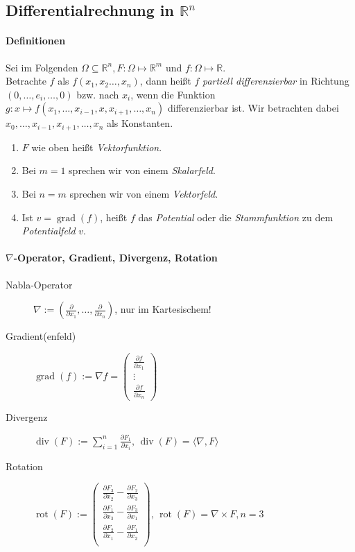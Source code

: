 \documentclass[a4paper, 9pt, DIV=24]{scrartcl}
\DeclareMathOperator{\grad}{grad}
\DeclareMathOperator{\rot}{rot}
\DeclareMathOperator{\Div}{div}
\newcommand{\R}{\mathbb{R}}
\begin{document}
\clearpage
\subsection{Differentialrechnung in $\mathbb{R}^n$}
\paragraph{Definitionen}
Sei im Folgenden $\Omega \subseteq \R^n, F: \Omega \mapsto \R^m$ und $f: \Omega \mapsto \R$. \\
Betrachte $f$ als $f(x_1,x_2\dots,x_n)$, dann heißt $f$ \emph{partiell differenzierbar} in Richtung $(0,\dots,e_i,\dots,0)$ bzw. nach $x_i$,
wenn die Funktion $g: x \mapsto f(x_1,\dots,x_{i-1},x,x_{i+1},\dots,x_n)$ differenzierbar ist. Wir betrachten dabei $x_0,\dots,x_{i-1},x_{i+1},\dots,x_n$ als Konstanten.

\begin{enumerate}[label={(}\arabic*{)}]
 \item $F$ wie oben heißt \emph{Vektorfunktion}.
 \item Bei $m = 1$ sprechen wir von einem \emph{Skalarfeld}.
 \item Bei $n = m$ sprechen wir von einem \emph{Vektorfeld}.
 \item Ist $v = \grad(f)$, heißt $f$ das \emph{Potential} oder die \emph{Stammfunktion} zu dem \emph{Potentialfeld} $v$.
\end{enumerate}

\paragraph{$\nabla$-Operator, Gradient, Divergenz, Rotation}
\begin{description}
 \item[Nabla-Operator] $\nabla := (\frac{\partial}{\partial x_1},\dots,\frac{\partial}{\partial x_n})$, nur im Kartesischem!
 \item[Gradient(enfeld)] $\grad(f) := \nabla f = \begin{pmatrix}\frac{\partial f}{\partial x_1} \\\vdots\\ \frac{\partial f}{\partial x_n}\end{pmatrix}$
 \item[Divergenz] $\Div(F) := \sum_{i=1}^n\frac{\partial F_1}{\partial x_i},\, \Div(F) = \langle \nabla, F \rangle$
 \item[Rotation] $\rot(F) := \begin{pmatrix}
\frac{\partial F_3}{\partial x_2} - \frac{\partial F_2}{\partial x_3} \\
\frac{\partial F_1}{\partial x_3} - \frac{\partial F_3}{\partial x_1} \\
\frac{\partial F_2}{\partial x_1} - \frac{\partial F_1}{\partial x_2} \\
\end{pmatrix},\, \rot(F) = \nabla \times F, n = 3$
\end{description}
\end{document}

